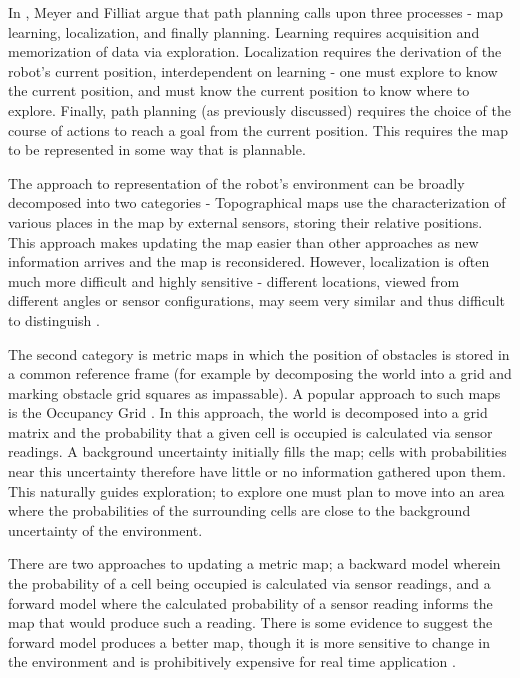 \documentclass[authoryearcitations]{UoYCSproject}
\begin{document}
In  \cite{meyer}, Meyer and Filliat argue that path planning calls upon three processes - map learning, localization, and finally planning. Learning requires acquisition and memorization of data via exploration. Localization requires the derivation of the robot's current position, interdependent on learning - one must explore to know the current position, and must know the current position to know where to explore. Finally, path planning (as previously discussed) requires the choice of the course of actions to reach a goal from the current position. This requires the map to be represented in some way that is plannable.

The approach to representation of the robot's environment can be broadly decomposed into two categories - Topographical maps use the characterization of various places in the map by external sensors, storing their relative positions. This approach makes updating the map easier than other approaches as new information arrives and the map is reconsidered. However, localization is often much more difficult and highly sensitive - different locations, viewed from different angles or sensor configurations, may seem very similar and thus difficult to distinguish \cite{meyer}.

The second category is metric maps in which the position of obstacles is stored in a common reference frame (for example by decomposing the world into a grid and marking obstacle grid squares as impassable). A popular approach to such maps is the Occupancy Grid \cite{elfes}. In this approach, the world is decomposed into a grid matrix and the probability that a given cell is occupied is calculated via sensor readings. A background uncertainty initially fills the map; cells with probabilities near this uncertainty therefore have little or no information gathered upon them. This naturally guides exploration; to explore one must plan to move into an area where the probabilities of the surrounding cells are close to the background uncertainty of the environment.

There are two approaches to updating a metric map; a backward model wherein the probability of a cell being occupied is calculated via sensor readings, and a forward model where the calculated probability of a sensor reading informs the map that would produce such a reading. There is some evidence to suggest the forward model produces a better map, though it is more sensitive to change in the environment and is prohibitively expensive for real time application \cite{thrun}.
\end{document}
